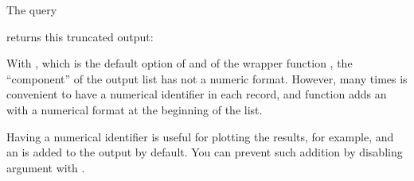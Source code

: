 \documentclass[a4paper,12pt,english]{sphinxhowto}
\begin{document}

The query

\begin{sphinxVerbatim}[commandchars=\\\{\},formatcom=\footnotesize]
 
\end{sphinxVerbatim}

returns this truncated output:

\begin{sphinxVerbatim}[commandchars=\\\{\},formatcom=\footnotesize]
\PYG{c+c1}{\PYGZsh{}[1] \PYGZdq{}[ ] / [ ] / [ ] / GER PO[ ]TIF / [ ] / [ ] / [ ] / [\PYGZdq{}}
\end{sphinxVerbatim}

With , which is the default option of  and of the wrapper
function , the  “component” of the output list has not a numeric
format. However, many times is convenient to have a numerical identifier in each record,
and function  adds an  with a numerical format at the beginning of the list.

Having a numerical identifier is useful for plotting the results, for example, and an  is added
to the output by default. You can prevent such addition by disabling
argument  with .
\end{document}
